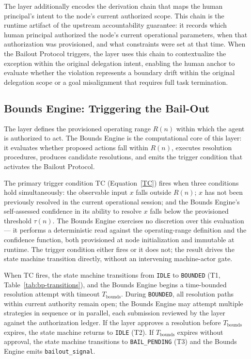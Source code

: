 The \purpose{} layer additionally encodes the derivation chain that maps the
human principal's intent to the node's current authorized scope.  This chain
is the runtime artifact of the upstream accountability guarantee: it records
which human principal authorized the node's current operational parameters,
when that authorization was provisioned, and what constraints were set at
that time.  When the Bailout Protocol triggers, the \purpose{} layer uses this
chain to contextualize the exception within the original delegation intent,
enabling the human anchor to evaluate whether the violation represents a
boundary drift within the original delegation scope or a goal misalignment
that requires full task termination.

\subsection{Bounds Engine: Triggering the Bail-Out}
\label{sec:bailout-bounds-engine}

The \bounds{} layer defines the provisioned operating range $R(n)$ within
which the agent is authorized to act.  The Bounds Engine is the computational
core of this layer: it evaluates whether proposed actions fall within $R(n)$,
executes resolution procedures, produces candidate resolutions, and emits the
trigger condition that activates the Bailout Protocol.

The primary trigger condition TC (Equation~\ref{TC}) fires when three
conditions hold simultaneously: the observable input $x$ falls outside $R(n)$;
$x$ has not been previously resolved in the current operational session; and
the Bounds Engine's self-assessed confidence in its ability to resolve $x$
falls below the provisioned threshold $\tau(n)$.  The Bounds Engine exercises
no discretion over this evaluation --- it performs a deterministic read against
the operating-range definition and the confidence function, both provisioned at
node initialization and immutable at runtime.  The trigger condition either
fires or it does not; the result drives the state machine transition directly,
without an intervening machine-actor gate.

When TC fires, the state machine transitions from \texttt{IDLE} to
\texttt{BOUNDED} (T1, Table~\ref{tab:bp-transitions}), and the Bounds Engine
begins a time-bounded resolution attempt with timeout $T_{\text{bounds}}$.
During \texttt{BOUNDED}, all resolution paths within current authority remain
open; the Bounds Engine may attempt multiple strategies in sequence or in
parallel, each submission reviewed by the \fact{} layer against the
authorization ledger.  If the \fact{} layer approves a resolution before
$T_{\text{bounds}}$ expires, the state machine returns to \texttt{IDLE} (T2).
If $T_{\text{bounds}}$ expires without approval, the state machine
transitions to \texttt{BAIL\_PENDING} (T3) and the Bounds Engine emits
\texttt{bailout\_signal}.

